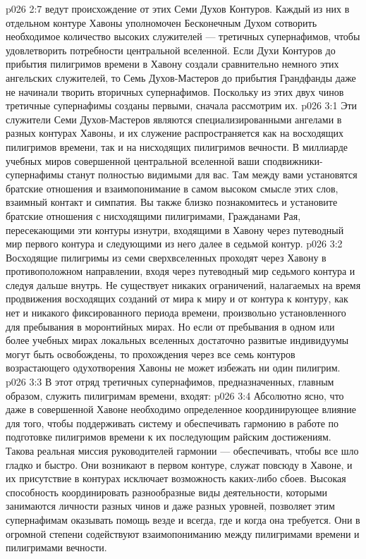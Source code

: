 \vs p026 2:7 \pc {} ведут происхождение от этих Семи Духов Контуров. Каждый из них в отдельном контуре Хавоны уполномочен Бесконечным Духом сотворить необходимое количество высоких служителей --- третичных супернафимов, чтобы удовлетворить потребности центральной вселенной. Если Духи Контуров до прибытия пилигримов времени в Хавону создали сравнительно немного этих ангельских служителей, то Семь Духов\hyp{}Мастеров до прибытия Грандфанды даже не начинали творить вторичных супернафимов. Поскольку из этих двух чинов третичные супернафимы созданы первыми, сначала рассмотрим их.
\vs p026 3:1 Эти служители Семи Духов\hyp{}Мастеров являются специализированными ангелами в разных контурах Хавоны, и их служение распространяется как на восходящих пилигримов времени, так и на нисходящих пилигримов вечности. В миллиарде учебных миров совершенной центральной вселенной ваши сподвижники\hyp{}супернафимы станут полностью видимыми для вас. Там между вами установятся братские отношения и взаимопонимание в самом высоком смысле этих слов, взаимный контакт и симпатия. Вы также близко познакомитесь и установите братские отношения с нисходящими пилигримами, Гражданами Рая, пересекающими эти контуры изнутри, входящими в Хавону через путеводный мир первого контура и следующими из него далее в седьмой контур.
\vs p026 3:2 Восходящие пилигримы из семи сверхвселенных проходят через Хавону в противоположном направлении, входя через путеводный мир седьмого контура и следуя дальше внутрь. Не существует никаких ограничений, налагаемых на время продвижения восходящих созданий от мира к миру и от контура к контуру, как нет и никакого фиксированного периода времени, произвольно установленного для пребывания в моронтийных мирах. Но если от пребывания в одном или более учебных мирах локальных вселенных достаточно развитые индивидуумы могут быть освобождены, то прохождения через все семь контуров возрастающего одухотворения Хавоны не может избежать ни один пилигрим.
\vs p026 3:3 \pc В этот отряд третичных супернафимов, предназначенных, главным образом, служить пилигримам времени, входят:
\vs p026 3:4 \bibnobreakspace {} Абсолютно ясно, что даже в совершенной Хавоне необходимо определенное координирующее влияние для того, чтобы поддерживать систему и обеспечивать гармонию в работе по подготовке пилигримов времени к их последующим райским достижениям. Такова реальная миссия руководителей гармонии --- обеспечивать, чтобы все шло гладко и быстро. Они возникают в первом контуре, служат повсюду в Хавоне, и их присутствие в контурах исключает возможность каких\hyp{}либо сбоев. Высокая способность координировать разнообразные виды деятельности, которыми занимаются личности разных чинов и даже разных уровней, позволяет этим супернафимам оказывать помощь везде и всегда, где и когда она требуется. Они в огромной степени содействуют взаимопониманию между пилигримами времени и пилигримами вечности.
